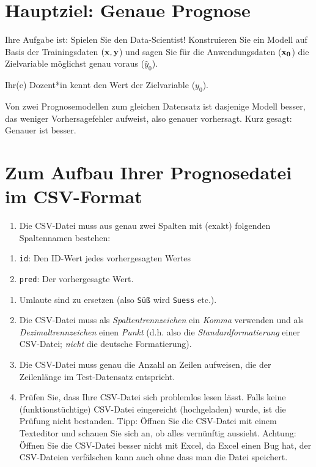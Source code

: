 \documentclass[
]{book}
\providecommand{\tightlist}{%
  \setlength{\itemsep}{0pt}\setlength{\parskip}{0pt}}
\begin{document}
\hypertarget{hauptziel-genaue-prognose}{%
\section{Hauptziel: Genaue Prognose}\label{hauptziel-genaue-prognose}}

Ihre Aufgabe ist: Spielen Sie den Data-Scientist!
Konstruieren Sie ein Modell auf Basis der Trainingsdaten \((\bf{x},y\))
und sagen Sie für die Anwendungsdaten (\(\bf{x_0}\)) die Zielvariable möglichst genau voraus (\(\hat{y}_0\)).

Ihr(e) Dozent*in kennt den Wert der Zielvariable (\(y_0\)).

Von zwei Prognosemodellen zum gleichen Datensatz ist dasjenige Modell besser,
das weniger Vorhersagefehler aufweist, also genauer vorhersagt.
Kurz gesagt: Genauer ist besser.

\hypertarget{zum-aufbau-ihrer-prognosedatei-im-csv-format}{%
\section{Zum Aufbau Ihrer Prognosedatei im CSV-Format}\label{zum-aufbau-ihrer-prognosedatei-im-csv-format}}

\begin{enumerate}
\def\labelenumi{\arabic{enumi}.}
\tightlist
\item
  Die CSV-Datei muss aus genau zwei Spalten mit (exakt) folgenden Spaltennamen bestehen:
\end{enumerate}

\begin{enumerate}
\def\labelenumi{\alph{enumi})}
\tightlist
\item
  \texttt{id}: Den ID-Wert jedes vorhergesagten Wertes
\item
  \texttt{pred}: Der vorhergesagte Wert.
\end{enumerate}

\begin{enumerate}
\def\labelenumi{\arabic{enumi}.}
\setcounter{enumi}{2}
\item
  Umlaute sind zu ersetzen (also \texttt{Süß} wird \texttt{Suess} etc.).
\item
  Die CSV-Datei muss als \emph{Spaltentrennzeichen} ein \emph{Komma} verwenden und als \emph{Dezimaltrennzeichen} einen \emph{Punkt} (d.h. also die \emph{Standardformatierung} einer CSV-Datei; \emph{nicht} die deutsche Formatierung).
\item
  Die CSV-Datei muss genau die Anzahl an Zeilen aufweisen, die der Zeilenlänge im Test-Datensatz entspricht.
\item
  Prüfen Sie, dass Ihre CSV-Datei sich problemlos lesen lässt.
  Falls keine (funktionstüchtige) CSV-Datei eingereicht (hochgeladen) wurde, ist die Prüfung nicht bestanden.
  Tipp: Öffnen Sie die CSV-Datei mit einem Texteditor und schauen Sie sich an, ob alles vernünftig aussieht.
  Achtung: Öffnen Sie die CSV-Datei besser nicht mit Excel, da Excel einen Bug hat,
  der CSV-Dateien verfälschen kann auch ohne dass man die Datei speichert.
\end{enumerate}
\end{document}
